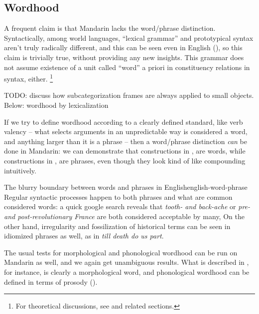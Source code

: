\documentclass[UTF8, a4paper, oneside, scheme=plain, 12pt]{ctexrep}
\newcommand{\form}[1]{\emph{#1}}
\begin{document}
\subsection{Wordhood}\label{sec:grammatical.wordhood}

A frequent claim is that Mandarin lacks the word/phrase distinction.
Syntactically, among world languages,
``lexical grammar'' and prototypical syntax aren't truly radically different,
and this can be seen even in English (),
so this claim is trivially true, without providing any new insights.
This grammar does not assume existence of a unit called ``word'' a priori in constituency relations in syntax, either.%
\footnote{
    For theoretical discussions, see  and related sections.
}

TODO: discuss how subcategorization frames are always applied to small objects.
Below: wordhood by lexicalization

If we try to define wordhood according to a clearly defined standard, like verb valency --
what selects arguments in an unpredictable way is considered a word,
and anything larger than it is a phrase --
then a word/phrase distinction \emph{can} be done in Mandarin:
we can demonstrate that constructions in ,
 are words,
while constructions in , 
are phrases, even though they look kind of like compounding intuitively.

\begin{theorybox}{The blurry boundary between words and phrases in English}{english-word-phrase}
    Regular syntactic processes happen to both phrases and what are common considered words:
    a quick google search reveals that \form{tooth- and back-ache}
    or \form{pre- and post-revolutionary France} are both considered acceptable by many,
    On the other hand, irregularity and fossilization of historical terms
    can be seen in idiomized phrases as well, as in \form{till death do us part}.
\end{theorybox}

The usual tests for morphological and phonological wordhood can be run on Mandarin as well,
and we again get unambiguous results.
What is described in ,
for instance, is clearly a morphological word,
and phonological wordhood can be defined in terms of prosody ().
\end{document}
